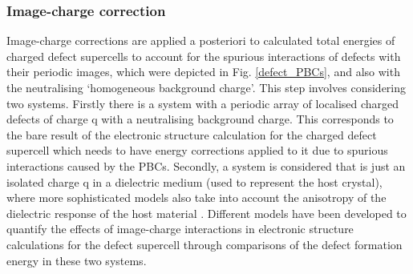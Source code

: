\documentclass[11pt, twoside]{report}
\begin{document}
\subsubsection{Image-charge correction}
Image-charge corrections are applied a posteriori to calculated total energies of charged defect supercells to account for the spurious interactions of defects with their periodic images, which were depicted in Fig. \ref{defect_PBCs}, and also with the neutralising `homogeneous background charge'. 
This step involves considering two systems. Firstly there is a system with a periodic array of localised charged defects of charge q with a neutralising background charge.
This corresponds to the bare result of the electronic structure calculation for the charged defect supercell which needs to have energy corrections applied to it due to spurious interactions caused by the PBCs. Secondly, a system is considered that is just an isolated charge q in a dielectric medium (used to represent the host crystal), where more sophisticated models also take into account the anisotropy of the dielectric response of the host material \cite{kumagai_oba}.
Different models have been developed to quantify the effects of image-charge interactions in electronic structure calculations for the defect supercell through comparisons of the defect formation energy in these two systems.
\end{document}

